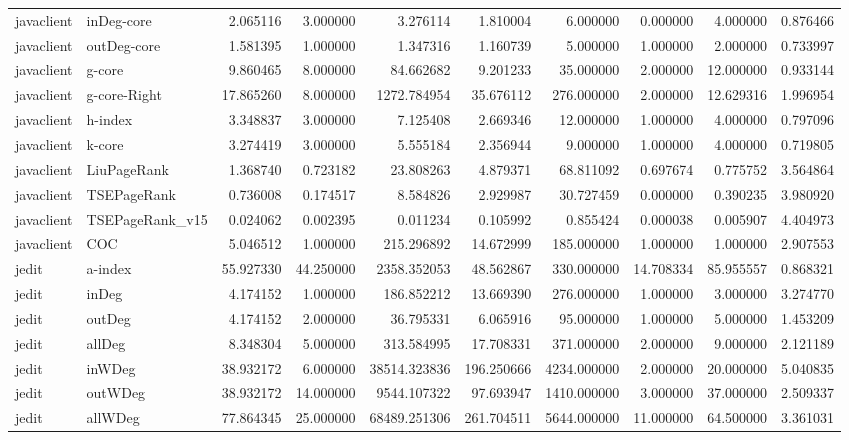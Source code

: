 \begin{tabular}{llrrrrrrrr}
javaclient & inDeg-core & 2.065116 & 3.000000 & 3.276114 & 1.810004 & 6.000000 & 0.000000 & 4.000000 & 0.876466 \\
javaclient & outDeg-core & 1.581395 & 1.000000 & 1.347316 & 1.160739 & 5.000000 & 1.000000 & 2.000000 & 0.733997 \\
javaclient & g-core & 9.860465 & 8.000000 & 84.662682 & 9.201233 & 35.000000 & 2.000000 & 12.000000 & 0.933144 \\
javaclient & g-core-Right & 17.865260 & 8.000000 & 1272.784954 & 35.676112 & 276.000000 & 2.000000 & 12.629316 & 1.996954 \\
javaclient & h-index & 3.348837 & 3.000000 & 7.125408 & 2.669346 & 12.000000 & 1.000000 & 4.000000 & 0.797096 \\
javaclient & k-core & 3.274419 & 3.000000 & 5.555184 & 2.356944 & 9.000000 & 1.000000 & 4.000000 & 0.719805 \\
javaclient & LiuPageRank & 1.368740 & 0.723182 & 23.808263 & 4.879371 & 68.811092 & 0.697674 & 0.775752 & 3.564864 \\
javaclient & TSEPageRank & 0.736008 & 0.174517 & 8.584826 & 2.929987 & 30.727459 & 0.000000 & 0.390235 & 3.980920 \\
javaclient & TSEPageRank_v15 & 0.024062 & 0.002395 & 0.011234 & 0.105992 & 0.855424 & 0.000038 & 0.005907 & 4.404973 \\
javaclient & COC & 5.046512 & 1.000000 & 215.296892 & 14.672999 & 185.000000 & 1.000000 & 1.000000 & 2.907553 \\
jedit & a-index & 55.927330 & 44.250000 & 2358.352053 & 48.562867 & 330.000000 & 14.708334 & 85.955557 & 0.868321 \\
jedit & inDeg & 4.174152 & 1.000000 & 186.852212 & 13.669390 & 276.000000 & 1.000000 & 3.000000 & 3.274770 \\
jedit & outDeg & 4.174152 & 2.000000 & 36.795331 & 6.065916 & 95.000000 & 1.000000 & 5.000000 & 1.453209 \\
jedit & allDeg & 8.348304 & 5.000000 & 313.584995 & 17.708331 & 371.000000 & 2.000000 & 9.000000 & 2.121189 \\
jedit & inWDeg & 38.932172 & 6.000000 & 38514.323836 & 196.250666 & 4234.000000 & 2.000000 & 20.000000 & 5.040835 \\
jedit & outWDeg & 38.932172 & 14.000000 & 9544.107322 & 97.693947 & 1410.000000 & 3.000000 & 37.000000 & 2.509337 \\
jedit & allWDeg & 77.864345 & 25.000000 & 68489.251306 & 261.704511 & 5644.000000 & 11.000000 & 64.500000 & 3.361031 \\

\end{tabular}
